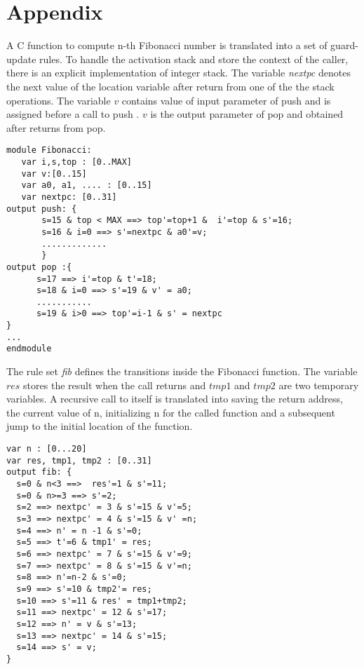 \documentclass{llncs}
\begin{document}
\section*{Appendix}
A C function to compute n-th Fibonacci number is translated into  a set of guard-update rules.
To handle the activation stack and store the context of the caller, there is an explicit implementation
of integer stack. The variable {\em nextpc} denotes the next value of the location variable
after return from one of the the stack operations.
The variable $v$ contains value of input parameter of push and  is assigned before a call to push
. $v$ is the output parameter of pop and obtained after returns from pop.
{\small
\begin{verbatim}
module Fibonacci:
   var i,s,top : [0..MAX]
   var v:[0..15]
   var a0, a1, .... : [0..15]
   var nextpc: [0..31] 
output push: {   
       s=15 & top < MAX ==> top'=top+1 &  i'=top & s'=16; 
       s=16 & i=0 ==> s'=nextpc & a0'=v;
       .............  
       }
output pop :{
      s=17 ==> i'=top & t'=18;
      s=18 & i=0 ==> s'=19 & v' = a0;
      ...........
      s=19 & i>0 ==> top'=i-1 & s' = nextpc
}
...
endmodule
\end{verbatim}
}
\noindent
The rule set {\em fib} defines the transitions inside the Fibonacci function. 
The variable $res$ stores the result when the call returns and $tmp1$ and $tmp2$ are two 
temporary variables.  
A recursive call to itself is translated into saving the return address,  the current value of n,
initializing n for the called function and a subsequent jump to the initial location of the function. 
{\footnotesize
\begin{verbatim}
var n : [0...20]      
var res, tmp1, tmp2 : [0..31]                       
output fib: {                                                 
  s=0 & n<3 ==>  res'=1 & s'=11;             
  s=0 & n>=3 ==> s'=2;                               
  s=2 ==> nextpc' = 3 & s'=15 & v'=5;          
  s=3 ==> nextpc' = 4 & s'=15 & v' =n;       
  s=4 ==> n' = n -1 & s'=0;                           
  s=5 ==> t'=6 & tmp1' = res;                      
  s=6 ==> nextpc' = 7 & s'=15 & v'=9;          
  s=7 ==> nextpc' = 8 & s'=15 & v'=n;        
  s=8 ==> n'=n-2 & s'=0;                                
  s=9 ==> s'=10 & tmp2'= res;                    
  s=10 ==> s'=11 & res' = tmp1+tmp2;         
  s=11 ==> nextpc' = 12 & s'=17;                    
  s=12 ==> n' = v & s'=13;                           
  s=13 ==> nextpc' = 14 & s'=15;               
  s=14 ==> s' = v;                                           
}                                                                         
\end{verbatim}
}
\end{document}
